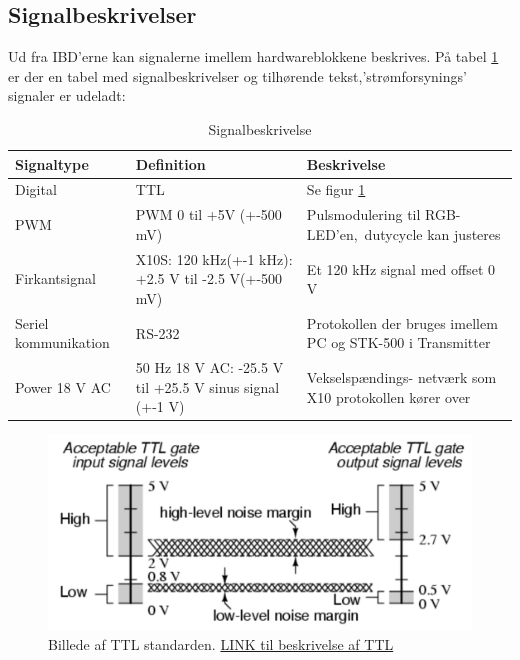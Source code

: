 \documentclass[oneside]{memoir}
\begin{document}
\subsection{Signalbeskrivelser}
Ud fra IBD'erne kan signalerne imellem hardwareblokkene beskrives. På tabel \ref{table:signals} er der
en tabel med signalbeskrivelser og tilhørende tekst,’strømforsynings’ signaler er udeladt: 
\begin{table}[H]
\centering
\caption{Signalbeskrivelse}
\label{table:signals}
\begin{tabular}{llp{2.5cm}}
\hline
\textbf{Signaltype }          & \textbf{Definition   }                                           & \textbf{Beskrivelse  }                                              \\ \hline
Digital              & TTL                                                &   Se figur \ref{fig:TTL}                       \\ \hline
PWM                  & PWM 0 til +5V (+-500 mV)                                & Pulsmodulering til RGB-LED'en,\ dutycycle kan justeres      \\ \hline
Firkantsignal        & X10S: 120 kHz(+-1 kHz): +2.5 V til -2.5 V(+-500 mV)              & Et 120 kHz signal med offset 0 V                           \\ \hline
Seriel kommunikation & RS-232                                                 & Protokollen der bruges imellem PC og STK-500 i Transmitter \\ \hline
Power 18 V AC        & 50 Hz 18 V AC: -25.5 V til +25.5 V sinus signal (+-1 V) & Vekselspændings- netværk som X10 protokollen kører over      \\ \hline
\end{tabular}
\end{table}
\begin{figure}[H]
	\centering
	\includegraphics[width=0.5\linewidth]{"billeder til latex/TTL"}
	\caption{Billede af TTL standarden.  \href{http://digital.ni.com/public.nsf/allkb/ACB4BD7550C4374C86256BFB0067A4BD}{LINK til beskrivelse af TTL}}
	\label{fig:TTL}
\end{figure} 
\newpage
\end{document}
